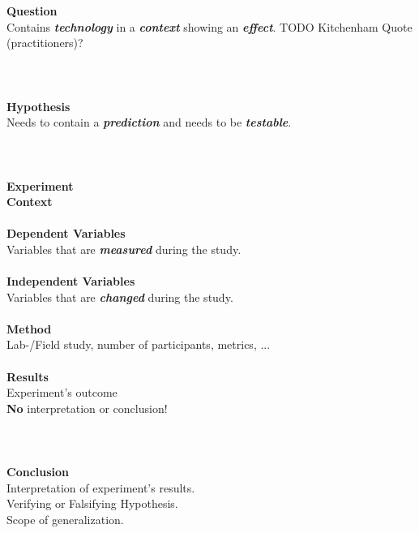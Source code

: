 {\large\textbf{Question}}\\
Contains \textbf{\textit{technology}} in a \textbf{\textit{context}} showing an \textbf{\textit{effect}}. TODO Kitchenham Quote (practitioners)?\\
\\
\\
\\
{\large\textbf{Hypothesis}}\\
Needs to contain a \textbf{\textit{prediction}} and needs to be \textbf{\textit{testable}}.\\
\\
\\
\\
{\large\textbf{Experiment}}\\
\textbf{Context}\\
\\
\textbf{Dependent Variables}\\
Variables that are  \textbf{\textit{measured}} during the study.\\
\\
\textbf{Independent Variables}\\
Variables that are  \textbf{\textit{changed}} during the study.\\
\\
\textbf{Method}\\
Lab-/Field study, number of participants, metrics, ...\\
\\
\textbf{Results}\\
Experiment's outcome\\
\textbf{No} interpretation or conclusion!\\
\\
\\
\\
{\large\textbf{Conclusion}}\\
Interpretation of experiment's results.\\
Verifying or Falsifying Hypothesis.\\
Scope of generalization.








